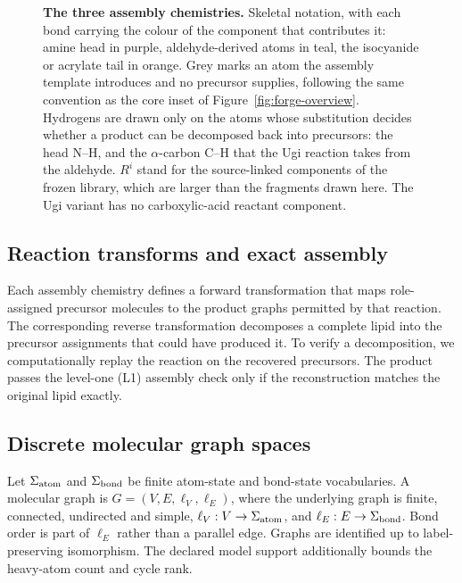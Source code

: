 \documentclass{article}
\begin{document}
\begin{figure}[tbp]
\centering

\caption{\textbf{The three assembly chemistries.} Skeletal notation, with each bond carrying the
colour of the component that contributes it: amine head in purple, aldehyde-derived atoms in teal,
the isocyanide or acrylate tail in orange. Grey marks an atom the assembly template introduces and
no precursor supplies, following the same convention as the core inset of
Figure~\ref{fig:forge-overview}. Hydrogens are drawn only on the atoms whose substitution decides
whether a product can be decomposed back into precursors: the head N--H, and the
$\alpha$-carbon C--H that the Ugi reaction takes from the aldehyde. $R^i$ stand for the
source-linked components of the frozen library, which are larger than the fragments drawn here.
The Ugi variant has no carboxylic-acid reactant component.}
\label{fig:reaction-schemes}
\end{figure}

\subsection{Reaction transforms and exact assembly}

Each assembly chemistry defines a forward transformation that maps role-assigned precursor
molecules to the product graphs permitted by that reaction.
The corresponding reverse transformation decomposes a complete lipid into the precursor
assignments that could have produced it.
To verify a decomposition, we computationally replay the reaction on the recovered precursors.
The product passes the level-one (L1) assembly check only if the reconstruction matches the original
lipid exactly.

\subsection{Discrete molecular graph spaces}

Let $\Sigma_{\rm atom}$ and $\Sigma_{\rm bond}$ be finite atom-state and bond-state vocabularies.
A molecular graph is $G=(V,E,\ell_V,\ell_E)$, where the underlying graph is finite, connected,
undirected and simple, $\ell_V:V\to\Sigma_{\rm atom}$, and
$\ell_E:E\to\Sigma_{\rm bond}$. Bond order is part of $\ell_E$ rather than a parallel edge.
Graphs are identified up to label-preserving isomorphism. The declared model support additionally
bounds the heavy-atom count and cycle rank.
\end{document}
